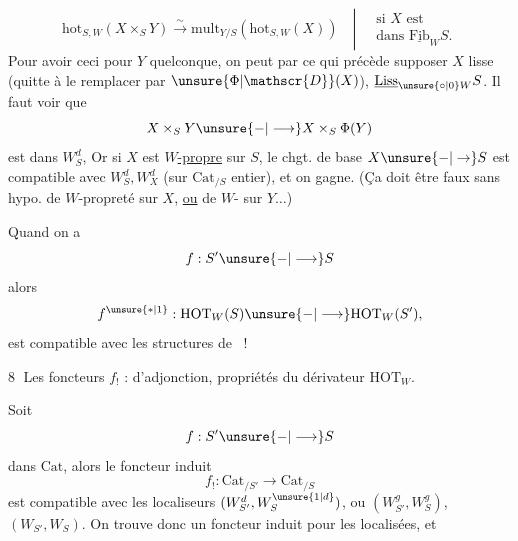 \[
\mathrm{hot}_{S,W}(X\times_S Y)\overset{\sim}{\longrightarrow}\mathrm{mult}_{Y/S}(\mathrm{hot}_{S,W}(X))\quad\left|\ \begin{aligned}&\text{si }X\text{ est}\\&\text{dans }\underline{\mathrm{Fib}}_W S.\end{aligned}\right.\tag*{$(*)$}
\]
Pour avoir ceci pour $Y$ quelconque, on peut par ce qui précède supposer $X$ lisse (quitte à le remplacer par $\unsure{\Phi|\mathscr{D}}(X)$),  $\underline{\mathrm{Liss}}_{\unsure{\circ|0}W}S$. Il faut voir que
\[
X\times_S Y\unsure{\mathbin{-}|\longrightarrow}X\times_S\Phi(Y)
\]
est   dans $W_S^d$,  Or  si $X$ est \uline{$W$-propre} sur $S$, le chgt. de base $X\unsure{\mathbin{-}|\to}S$ est compatible avec $W_S^d,W_X^d$ (sur $\mathrm{Cat}_{/S}$  entier), et on gagne. (Ça doit être faux sans hypo. de $W$-propreté sur $X$, \uline{ou} de $W$- sur $Y\ldots$)

Quand on a
\[
f:S'\unsure{\mathbin{-}|\longrightarrow}S
\]
alors
\[
f^{\unsure{*|1}}:\mathrm{HOT}_W(S)\unsure{\mathbin{-}|\longrightarrow}\mathrm{HOT}_W(S'),
\]
est compatible avec les structures de ~!

\textcircled{8} Les foncteurs $f_!$ :  d'adjonction, propriétés du dérivateur $\mathrm{HOT}_W$.

Soit
\[
f:S'\unsure{\mathbin{-}|\longrightarrow}S
\]
dans $\mathrm{Cat}$, alors le foncteur induit
\[
f_!:\mathrm{Cat}_{/S'}\longrightarrow\mathrm{Cat}_{/S}
\]
est compatible avec les localiseurs $(W_{S'}^d,W_S^{\unsure{1|d}})$, ou $(W_{S'}^g,W_S^g)$,  $(W_{S'},W_S)$. On trouve donc un foncteur induit pour les localisées, et  


